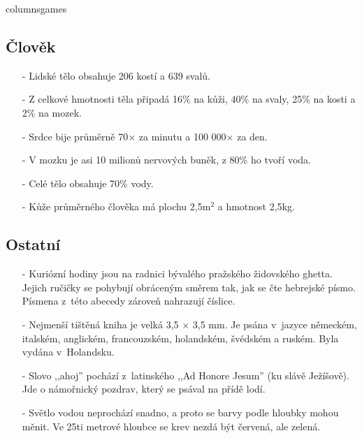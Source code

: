 \begin{multicols}{\value{columnsgames}columnsgames}
\begin{itemize}
\end{itemize}

\subsection{Člověk}

\begin{itemize}
\itemsep -3pt

\item[-] Lidské tělo obsahuje 206 kostí a 639 svalů.

\item[-] Z celkové hmotnosti těla připadá 16\% na kůži, 40\% na svaly,
25\% na kosti a 2\% na mozek.

\item[-] Srdce bije průměrně 70$\times$ za minutu a 100 000$\times$ za
den.

\item[-] V mozku je asi 10 milionů nervových buněk, z 80\% ho tvoří voda.

\item[-] Celé tělo obsahuje 70\% vody.

\item[-] Kůže průměrného člověka má plochu 2,5m$^2$ a hmotnost 2,5kg.

\end{itemize}

\subsection{Ostatní}

\begin{itemize}
\itemsep -3pt

\item[-] Kuriózní hodiny jsou na radnici bývalého pražského židovského 
ghetta. Jejich ručičky se pohybují obráceným směrem tak, jak 
se čte hebrejské písmo. Písmena z~této abecedy zároveň 
nahrazují číslice.

\item[-] Nejmenší tištěná kniha je velká 3,5 $\times$ 3,5 mm. Je psána
v~jazyce německém, italském, anglickém, francouzském, holandském, švédském
a ruském. Byla vydána v~Holandsku.

\item[-] Slovo ,,ahoj'' pochází z~latinského ,,Ad Honore Jesum'' 
(ku slávě Ježíšově). Jde o námořnický pozdrav, který se psával 
na přídě lodí.

\item[-] Světlo vodou neprochází snadno, a proto se barvy podle hloubky 
mohou měnit. Ve 25ti metrové hloubce se krev nezdá být červená, 
ale zelená.


\end{itemize}
\end{multicols}
